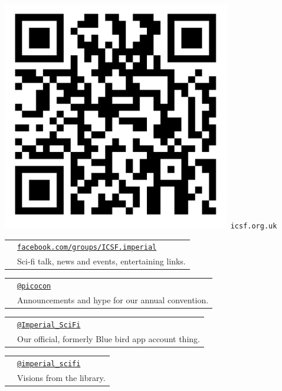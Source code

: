 \newcommand{\socialmedia}[3]{
  \begin{tabular}{r l}
    \multirow{2}{*}{\LARGE {#1}}
    & \texttt{#2} \\[-0.5em]
    & {\footnotesize #3}
  \end{tabular}
}
\begin{minipage}[t]{0.33\textwidth}
  \vspace{-1.3em}
  \begin{center}
  \includegraphics[width=0.75\textwidth]{img/qr-mailing-list.png}
  \texttt{icsf.org.uk}
  \end{center}
\end{minipage}
\begin{minipage}[t]{0.4\textwidth}
  \vspace{0em}
  \socialmedia{\faFacebookOfficial}{\href{https://www.facebook.com/groups/ICSF.imperial}{facebook.com/groups/ICSF.imperial}}{
    Sci-fi talk, news and events, entertaining links.}
  \socialmedia{\faTwitter}{\href{https://twitter.com/picocon}{@picocon}}{
    Announcements and hype for our annual convention.}
  \socialmedia{\faTwitter}{{\href{https://twitter.com/Imperial_SciFi}{@Imperial\_SciFi}}}{
    Our official, formerly Blue bird app account thing.}
  \socialmedia{\faInstagram}{\href{https://www.instagram.com/imperial_scifi/?hl=en}{@imperial\_scifi}}{
    Visions from the library.}
\end{minipage}

